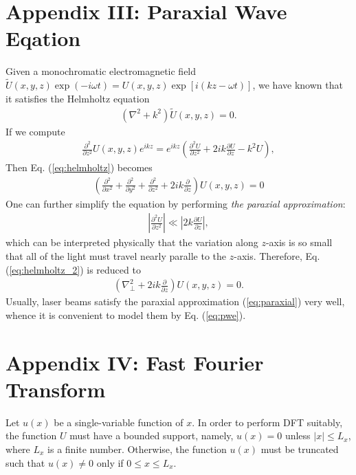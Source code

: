 \section*{Appendix III: Paraxial Wave Eqation}
\label{sec:pwe}
Given a monochromatic electromagnetic field $\tilde{U}(x, y, z) \exp(-i \omega t) = U(x, y, z)\exp[i (kz - \omega t)]$, we have known that it satisfies the Helmholtz equation
\begin{eqnarray}
	\left(\nabla^2 + k^2\right) \tilde{U}(x, y, z) = 0.
	\label{eq:helmholtz}
\end{eqnarray}
If we compute
\begin{eqnarray}
	\frac{\partial^2}{\partial z^2} U(x, y, z)e^{ikz} = e^{ikz}
	\left( \frac{\partial^2 U}{\partial z^2} + 2ik \frac{\partial U}{\partial z} - k^2 U \right),
	\nonumber
\end{eqnarray}
Then Eq. (\ref{eq:helmholtz}) becomes
\begin{eqnarray}
	\left(\frac{\partial^2}{\partial x^2} + \frac{\partial^2}{\partial y^2} + \frac{\partial^2}{\partial z^2} + 2ik \frac{\partial}{\partial z} \right) U(x, y, z) = 0
	\label{eq:helmholtz_2}
\end{eqnarray}
One can further simplify the equation by performing {\em the paraxial approximation}:
\begin{eqnarray}
	\left| \frac{\partial^2 U}{\partial z^2} \right| \ll \left| 2k \frac{\partial U}{\partial z} \right|,
	\label{eq:paraxial}
\end{eqnarray}
which can be interpreted physically that the variation along $z$-axis is so small that all of the light must travel nearly paralle to the $z$-axis. Therefore, Eq. (\ref{eq:helmholtz_2}) is reduced to
\begin{eqnarray}
	\left(\nabla_{\perp}^2 + 2ik \frac{\partial}{\partial z} \right) U(x, y, z) = 0.
	\label{eq:pwe}
\end{eqnarray}
Usually, laser beams satisfy the paraxial approximation (\ref{eq:paraxial}) very well, whence it is convenient to model them by Eq. (\ref{eq:pwe}).

\section*{Appendix IV: Fast Fourier Transform}

Let $u(x)$ be a single-variable function of $x$.
In order to perform DFT suitably, the function $U$ must have a bounded support, namely,
$u(x) = 0$ unless $|x| \leq L_x$, where $L_x$ is a finite number.
Otherwise, the function $u(x)$ must be truncated such that $u(x) \neq 0$ only if $0 \leq x \leq L_x$. 

